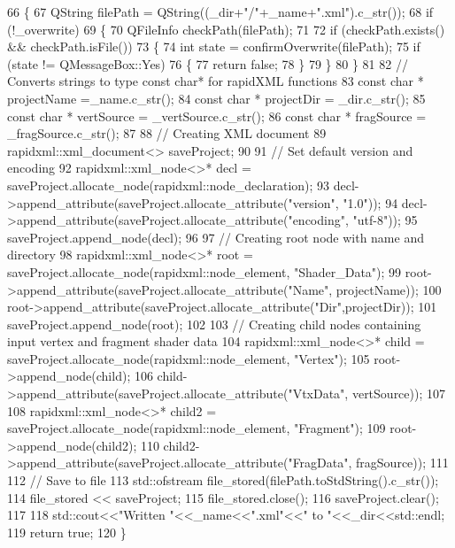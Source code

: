 \begin{DoxyCode}
66 \{
67   QString filePath = QString((\_dir+\textcolor{stringliteral}{"/"}+\_name+\textcolor{stringliteral}{".xml"}).c\_str());
68   \textcolor{keywordflow}{if} (!\_overwrite)
69   \{
70     QFileInfo checkPath(filePath);
71 
72     \textcolor{keywordflow}{if} (checkPath.exists() && checkPath.isFile())
73     \{
74       \textcolor{keywordtype}{int} state = confirmOverwrite(filePath);
75       \textcolor{keywordflow}{if} (state != QMessageBox::Yes)
76       \{
77         \textcolor{keywordflow}{return} \textcolor{keyword}{false};
78       \}
79     \}
80   \}
81 
82   \textcolor{comment}{// Converts strings to type const char* for rapidXML functions}
83   \textcolor{keyword}{const} \textcolor{keywordtype}{char} * projectName =\_name.c\_str();
84   \textcolor{keyword}{const} \textcolor{keywordtype}{char} * projectDir = \_dir.c\_str();
85   \textcolor{keyword}{const} \textcolor{keywordtype}{char} * vertSource = \_vertSource.c\_str();
86   \textcolor{keyword}{const} \textcolor{keywordtype}{char} * fragSource = \_fragSource.c\_str();
87 
88   \textcolor{comment}{// Creating XML document}
89   rapidxml::xml\_document<> saveProject;
90 
91   \textcolor{comment}{// Set default version and encoding}
92   rapidxml::xml\_node<>* decl = saveProject.allocate\_node(rapidxml::node\_declaration);
93   decl->append\_attribute(saveProject.allocate\_attribute(\textcolor{stringliteral}{"version"}, \textcolor{stringliteral}{"1.0"}));
94   decl->append\_attribute(saveProject.allocate\_attribute(\textcolor{stringliteral}{"encoding"}, \textcolor{stringliteral}{"utf-8"}));
95   saveProject.append\_node(decl);
96 
97   \textcolor{comment}{// Creating root node with name and directory}
98   rapidxml::xml\_node<>* root = saveProject.allocate\_node(rapidxml::node\_element, \textcolor{stringliteral}{"Shader\_Data"});
99   root->append\_attribute(saveProject.allocate\_attribute(\textcolor{stringliteral}{"Name"}, projectName));
100   root->append\_attribute(saveProject.allocate\_attribute(\textcolor{stringliteral}{"Dir"},projectDir));
101   saveProject.append\_node(root);
102 
103   \textcolor{comment}{// Creating child nodes containing input vertex and fragment shader data}
104   rapidxml::xml\_node<>* child = saveProject.allocate\_node(rapidxml::node\_element, \textcolor{stringliteral}{"Vertex"});
105   root->append\_node(child);
106   child->append\_attribute(saveProject.allocate\_attribute(\textcolor{stringliteral}{"VtxData"}, vertSource));
107 
108   rapidxml::xml\_node<>* child2 = saveProject.allocate\_node(rapidxml::node\_element, \textcolor{stringliteral}{"Fragment"});
109   root->append\_node(child2);
110   child2->append\_attribute(saveProject.allocate\_attribute(\textcolor{stringliteral}{"FragData"}, fragSource));
111 
112   \textcolor{comment}{// Save to file}
113   std::ofstream file\_stored(filePath.toStdString().c\_str());
114   file\_stored << saveProject;
115   file\_stored.close();
116   saveProject.clear();
117 
118   std::cout<<\textcolor{stringliteral}{"Written "}<<\_name<<\textcolor{stringliteral}{".xml"}<<\textcolor{stringliteral}{" to "}<<\_dir<<std::endl;
119   \textcolor{keywordflow}{return} \textcolor{keyword}{true};
120 \}
\end{DoxyCode}


